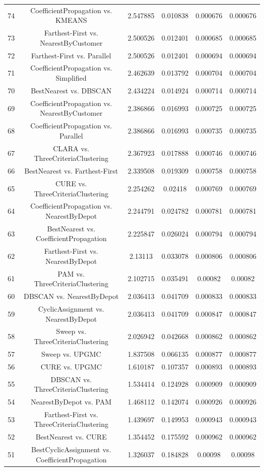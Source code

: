 \documentclass[a4paper,10pt]{article}
\begin{document}
\begin{landscape}
\begin{table}[!htp]
\begin{tabular}{cccccc}
74&CoefficientPropagation vs. KMEANS&2.547885&0.010838&0.000676&0.000676\\
73&Farthest-First vs. NearestByCustomer&2.500526&0.012401&0.000685&0.000685\\
72&Farthest-First vs. Parallel&2.500526&0.012401&0.000694&0.000694\\
71&CoefficientPropagation vs. Simplified&2.462639&0.013792&0.000704&0.000704\\
70&BestNearest vs. DBSCAN&2.434224&0.014924&0.000714&0.000714\\
69&CoefficientPropagation vs. NearestByCustomer&2.386866&0.016993&0.000725&0.000725\\
68&CoefficientPropagation vs. Parallel&2.386866&0.016993&0.000735&0.000735\\
67&CLARA vs. ThreeCriteriaClustering&2.367923&0.017888&0.000746&0.000746\\
66&BestNearest vs. Farthest-First&2.339508&0.019309&0.000758&0.000758\\
65&CURE vs. ThreeCriteriaClustering&2.254262&0.02418&0.000769&0.000769\\
64&CoefficientPropagation vs. NearestByDepot&2.244791&0.024782&0.000781&0.000781\\
63&BestNearest vs. CoefficientPropagation&2.225847&0.026024&0.000794&0.000794\\
62&Farthest-First vs. NearestByDepot&2.13113&0.033078&0.000806&0.000806\\
61&PAM vs. ThreeCriteriaClustering&2.102715&0.035491&0.00082&0.00082\\
60&DBSCAN vs. NearestByDepot&2.036413&0.041709&0.000833&0.000833\\
59&CyclicAssignment vs. NearestByDepot&2.036413&0.041709&0.000847&0.000847\\
58&Sweep vs. ThreeCriteriaClustering&2.026942&0.042668&0.000862&0.000862\\
57&Sweep vs. UPGMC&1.837508&0.066135&0.000877&0.000877\\
56&CURE vs. UPGMC&1.610187&0.107357&0.000893&0.000893\\
55&DBSCAN vs. ThreeCriteriaClustering&1.534414&0.124928&0.000909&0.000909\\
54&NearestByDepot vs. PAM&1.468112&0.142074&0.000926&0.000926\\
53&Farthest-First vs. ThreeCriteriaClustering&1.439697&0.149953&0.000943&0.000943\\
52&BestNearest vs. CURE&1.354452&0.175592&0.000962&0.000962\\
51&BestCyclicAssignment vs. CoefficientPropagation&1.326037&0.184828&0.00098&0.00098\\

\end{tabular}
\end{table}
\end{landscape}
\end{document}
